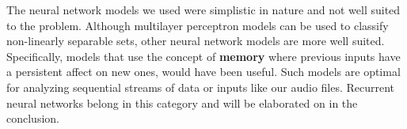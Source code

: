 The neural network models we used were simplistic in nature and not well suited to the problem. Although multilayer perceptron models can be used to classify non-linearly separable sets, other neural network models are more well suited. Specifically, models that use the concept of \textbf{memory} where previous inputs have a persistent affect on new ones, would have been useful. Such models are optimal for analyzing sequential streams of data or inputs like our audio files. Recurrent neural networks belong in this category and will be elaborated on in the conclusion.